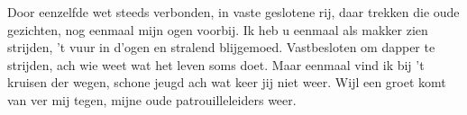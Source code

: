 \beginverse*
Door eenzelfde wet steeds verbonden,
in vaste geslotene rij,
daar trekken die oude gezichten,
nog eenmaal mijn ogen voorbij.
Ik heb u eenmaal als makker zien strijden,
't vuur in d’ogen en stralend blijgemoed.
Vastbesloten om dapper te strijden,
ach wie weet wat het leven soms doet.
Maar eenmaal vind ik bij 't kruisen der wegen,
schone jeugd ach wat keer jij niet weer.
Wijl een groet komt van ver mij tegen,
mijne oude patrouilleleiders weer.
\endverse
\endsong